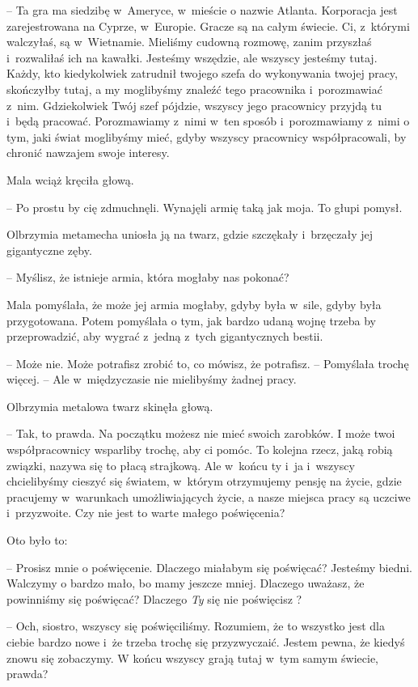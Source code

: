\documentclass[oneside,polish,11pt,rmheadings]{mwbk}
\begin{document}
-- Ta gra ma siedzibę w~Ameryce, w~mieście o nazwie Atlanta. Korporacja jest zarejestrowana na Cyprze, w~Europie. Gracze są na całym świecie. Ci, z~którymi walczyłaś, są w~Wietnamie. Mieliśmy cudowną rozmowę, zanim przyszłaś i~rozwaliłaś ich na kawałki. Jesteśmy wszędzie, ale wszyscy jesteśmy tutaj. Każdy, kto kiedykolwiek zatrudnił twojego szefa do wykonywania twojej pracy, skończyłby tutaj, a my moglibyśmy znaleźć tego pracownika i~porozmawiać z~nim. Gdziekolwiek Twój szef pójdzie, wszyscy jego pracownicy przyjdą tu i~będą pracować. Porozmawiamy z~nimi w~ten sposób i~porozmawiamy z~nimi o tym, jaki świat moglibyśmy mieć, gdyby wszyscy pracownicy współpracowali, by chronić nawzajem swoje interesy. 


Mala wciąż kręciła głową. 

-- Po prostu by cię zdmuchnęli. Wynajęli armię taką jak moja. To głupi pomysł. 


Olbrzymia metamecha uniosła ją na twarz, gdzie szczękały i~brzęczały jej gigantyczne zęby. 

-- Myślisz, że istnieje armia, która mogłaby nas pokonać? 


Mala pomyślała, że może jej armia mogłaby, gdyby była w~sile, gdyby była przygotowana. Potem pomyślała o tym, jak bardzo udaną wojnę trzeba by przeprowadzić, aby wygrać z~jedną z~tych gigantycznych bestii. 

-- Może nie. Może potrafisz zrobić to, co mówisz, że potrafisz. -- Pomyślała trochę więcej. -- Ale w~międzyczasie nie mielibyśmy żadnej pracy. 


Olbrzymia metalowa twarz skinęła głową. 

-- Tak, to prawda. Na początku możesz nie mieć swoich zarobków. I może twoi współpracownicy wsparliby trochę, aby ci pomóc. To kolejna rzecz, jaką robią związki, nazywa się to płacą strajkową. Ale w~końcu ty i~ja i~wszyscy chcielibyśmy cieszyć się światem, w~którym otrzymujemy pensję na życie, gdzie pracujemy w~warunkach umożliwiających życie, a nasze miejsca pracy są uczciwe i~przyzwoite. Czy nie jest to warte małego poświęcenia? 


Oto było to: 

-- Prosisz mnie o poświęcenie. Dlaczego miałabym się poświęcać? Jesteśmy biedni. Walczymy o bardzo mało, bo mamy jeszcze mniej. Dlaczego uważasz, że powinniśmy się poświęcać? Dlaczego \textit{Ty }się nie poświęcisz ? 


-- Och, siostro, wszyscy się poświęciliśmy. Rozumiem, że to wszystko jest dla ciebie bardzo nowe i~że trzeba trochę się przyzwyczaić. Jestem pewna, że kiedyś znowu się zobaczymy. W końcu wszyscy grają tutaj w~tym samym świecie, prawda? 
\end{document}
